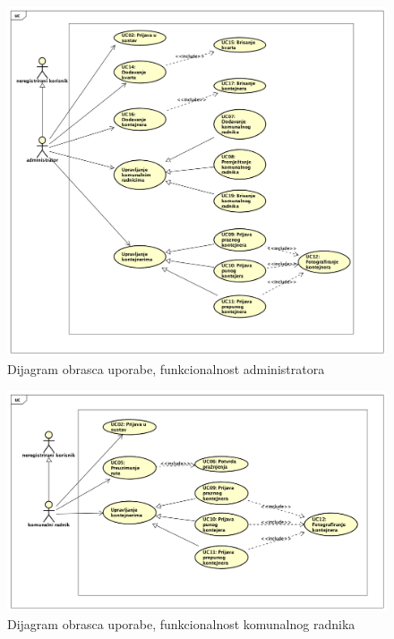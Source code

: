						
				\begin{figure}[H]
					\includegraphics[scale=0.5]{figures/pravi_UC_za_administratora.PNG}
					\centering
					\caption{Dijagram obrasca uporabe, funkcionalnost administratora}
					\label{fig:ucad-diag}
				\end{figure}
			
				\begin{figure}[H]
					\includegraphics[scale=0.4]{figures/pravi_UC_za_smetlara.PNG}
					\centering
					\caption{Dijagram obrasca uporabe, funkcionalnost komunalnog radnika}
					\label{fig:ucad-diag}
				\end{figure}
			
				
			
